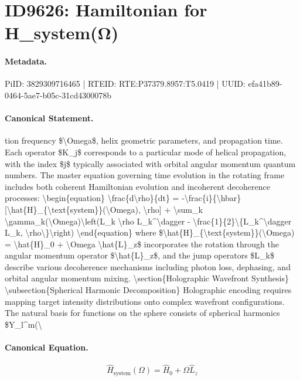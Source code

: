 \section*{ID9626: Hamiltonian for H\_system(Ω)}
\paragraph{Metadata.}
PiID: 3829309716465 | RTEID: RTE:P37379.8957:T5.0419 | UUID: efa41b89-0464-5ae7-b05c-31cd4300078b

\paragraph{Canonical Statement.}
tion frequency \$\textbackslash{}Omega\$, helix geometric parameters, and propagation time. Each operator \$K\_j\$ corresponds to a particular mode of helical propagation, with the index \$j\$ typically associated with orbital angular momentum quantum numbers. The master equation governing time evolution in the rotating frame includes both coherent Hamiltonian evolution and incoherent decoherence processes: \textbackslash{}begin\{equation\} \textbackslash{}frac\{d\textbackslash{}rho\}\{dt\} = -\textbackslash{}frac\{i\}\{\textbackslash{}hbar\}[\textbackslash{}hat\{H\}\_\{\textbackslash{}text\{system\}\}(\textbackslash{}Omega), \textbackslash{}rho] + \textbackslash{}sum\_k \textbackslash{}gamma\_k(\textbackslash{}Omega)\textbackslash{}left(L\_k \textbackslash{}rho L\_k\textasciicircum{}\textbackslash{}dagger - \textbackslash{}frac\{1\}\{2\}\textbackslash{}\{L\_k\textasciicircum{}\textbackslash{}dagger L\_k, \textbackslash{}rho\textbackslash{}\}\textbackslash{}right) \textbackslash{}end\{equation\} where \$\textbackslash{}hat\{H\}\_\{\textbackslash{}text\{system\}\}(\textbackslash{}Omega) = \textbackslash{}hat\{H\}\_0 + \textbackslash{}Omega \textbackslash{}hat\{L\}\_z\$ incorporates the rotation through the angular momentum operator \$\textbackslash{}hat\{L\}\_z\$, and the jump operators \$L\_k\$ describe various decoherence mechanisms including photon loss, dephasing, and orbital angular momentum mixing. \textbackslash{}section\{Holographic Wavefront Synthesis\} \textbackslash{}subsection\{Spherical Harmonic Decomposition\} Holographic encoding requires mapping target intensity distributions onto complex wavefront configurations. The natural basis for functions on the sphere consists of spherical harmonics \$Y\_l\textasciicircum{}m(\textbackslash{}

\paragraph{Canonical Equation.}
\[
\hat{H}_{\text{system}}(\Omega) = \hat{H}_0 + \Omega \hat{L}_z
\]

